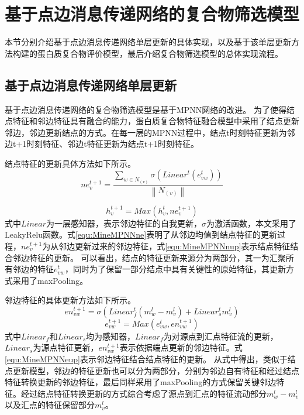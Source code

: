 \section{基于点边消息传递网络的复合物筛选模型}
\label{section:MPNN:detail}

本节分别介绍基于点边消息传递网络单层更新的具体实现，以及基于该单层更新方法构建的蛋白质复合物评价模型，最后介绍复合物筛选模型的总体实现流程。

\subsection{基于点边消息传递网络单层更新}
\label{section:MPNN:update}
基于点边消息传递网络的复合物筛选模型是基于MPNN网络的改进。
为了使得结点特征和邻边特征具有融合的能力，蛋白质复合物特征融合模型中采用了结点更新邻边，邻边更新结点的方式。在每一层的MPNN过程中，结点t时刻特征更新为邻边t+1时刻特征、邻边t特征更新为结点t+1时刻特征。

结点特征的更新具体方法如下所示。
\begin{equation}
    \label{equ:MineMPNNne}
    ne_v^{t+1} = \frac{\sum_{w \in N_{(v)}}\sigma (Linear^t(e_{vw}^t))}{\left\lVert N_{(v)}\right\rVert }
\end{equation}

\begin{equation}
    \label{equ:MineMPNNnup}
    h_v^{t+1} = Max(h_v^t,ne_v^{t+1})
\end{equation}
式中$Linear$为一层感知器，表示邻边特征的自我更新，$\sigma $为激活函数，本文采用了LeakyRelu函数。式\ref{equ:MineMPNNne}表明了从邻边均值到结点特征的更新过程，$ne_v^{t+1}$为从邻边更新过来的邻边特征，式\ref{equ:MineMPNNnup}表示结点特征结合邻边特征的更新。
可以看出，结点的特征更新来源分为两部分，其一为汇聚所有邻边的特征$e_{vw}^t$，同时为了保留一部分结点中具有关键性的原始特征，其更新方式采用了maxPooling。

邻边特征的具体更新方法如下所示。
\begin{equation}
    \label{equ:MineMPNNen}
    en_{vw}^{t+1} = \sigma (Linear_f^t(m_w^{l} - m_v^{l}) + Linear_s^t m_v^{l})
\end{equation}
\begin{equation}
    \label{equ:MineMPNNeup}
    e_{vw}^{t+1} = Max(e_{vw}^t,en_{vw}^{t+1})
\end{equation}
式中$Linear_f$和$Linear_s$均为感知器，$Linear_f$为对源点到汇点特征流的更新，$Linear_s$为源点特征更新，$en_{vw}^{t+1}$表示依据端点更新的邻边特征。式\ref{equ:MineMPNNeup}表示邻边特征结合结点特征的更新。
从式中得出，类似于结点更新模型，邻边的特征更新也可以分为两部分，分别为邻边自有特征和经过结点特征转换更新的邻边特征，最后同样采用了maxPooling的方式保留关键邻边特征。经过结点特征转换更新的方式综合考虑了源点到汇点的特征流动部分$m_w^{l} - m_v^{l}$以及汇点的特征保留部分$m_v^{l}$。

